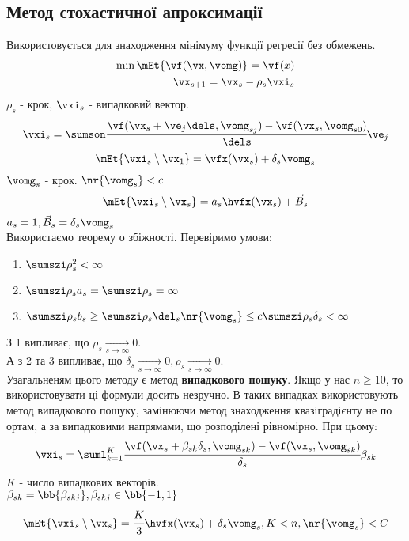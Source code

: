 \subsection{Метод стохастичної апроксимації}
Використовується для знаходження мінімуму функції регресії без обмежень. 
\begin{eqnarray}
\min\mEt{\vf(\vx,\vomg)} = \vf(x) \\
\vx_{s+1} = \vx_s - \rho_s \vxi_s
\end{eqnarray}
$\rho_s$ - крок, $\vxi_s$ - випадковий вектор.\\
\begin{equation}
\vxi_s = \sumson \cfrac{\vf(\vx_s+\ve_j\dels,\vomg_{sj}) - \vf(\vx_s,\vomg_{s0})}{\dels} \ve_j
\end{equation}
\begin{equation}
\mEt{\vxi_s\setminus \vx_1} = \vfx(\vx_s) + \delta_s \vomg_s 
\end{equation}
$\vomg_s$ - крок. $\nr{\vomg_s}<c$\\
\begin{equation}
\mEt{\vxi_s\setminus \vx_s} = a_s \hvfx(\vx_s) +\vec{B}_s
\end{equation}
$a_s = 1, \vec{B}_s = \delta_s \vomg_s$\\
Використаємо теорему о збіжності. Перевіримо умови:
\begin{enumerate}
\item $\sumszi \rho_s^2 < \infty$
\item $\sumszi \rho_s a_s = \sumszi \rho_s = \infty$
\item $\sumszi \rho_s b_s \geq \sumszi \rho_s \del_s \nr{\vomg_s} \leq c\sumszi \rho_s \delta_s < \infty$
\end{enumerate}
З 1 випливає, що $\rho_s \xrightarrow[s\to\infty]{} 0$.\\
А з 2 та 3 випливає, що $\delta_s \xrightarrow[s\to\infty]{}0,\rho_s \xrightarrow[s\to\infty]{} 0$.\\
Узагальненям цього методу є метод \textbf{випадкового пошуку}. Якщо у нас $n\geq 10$, то використовувати ці формули досить незручно. В таких випадках використовують метод випадкового пошуку, замінюючи метод знаходження квазіградієнту не по ортам, а за випадковими напрямами, що %
розподілені рівномірно. При цьому:
\begin{equation}
\vxi_s = \suml_{k=1}^K \cfrac{\vf(\vx_s+\beta_{sk}\delta_s,\vomg_{sk}) - \vf(\vx_s,\vomg_{sk})}{\delta_s}\beta_{sk}
\end{equation}
$K$ - число випадкових векторів.\\
$\beta_{sk} = \bb{\beta_{skj}},\beta_{skj} \in\bb{-1,1}$\\
\begin{equation}
\mEt{\vxi_s\setminus \vx_s} = \cfrac K3 \hvfx (\vx_s) + \delta_s\vomg_s, K<n,\nr{\vomg_s}<C
\end{equation}
